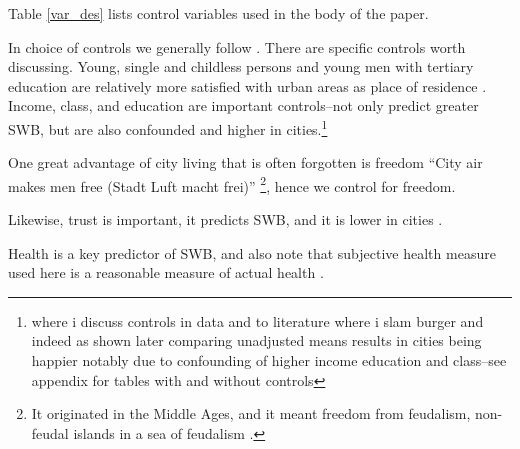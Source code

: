 \documentclass[10pt, letterpaper]{article}
\begin{document}


Table \ref{var_des} lists control variables used in the body of the
paper.%


 

In choice of controls we generally follow \citep{aok20}. There are specific
controls worth discussing.
%
 Young, single and childless persons and young men with tertiary education are
 relatively more satisfied with urban areas as place of residence \citep{anon-regional-studies-19}.
Income, class,  and education are important controls--not only predict greater
 SWB, but are also confounded and higher in cities.\footnote{where i discuss controls in data and to literature where i slam
  burger and indeed as shown later comparing unadjusted means results in cities
   being happier notably due to confounding of higher income education and
   class--see appendix for tables with and without controls} 

 One great advantage of city living that is often forgotten is freedom ``City
 air makes men free (Stadt Luft macht frei)'' \citet[p. 12]{park84}\footnote{It
   originated in the Middle Ages, and it meant freedom from feudalism,
   non-feudal islands in a sea of feudalism \citep{harvey12}.}, hence we control
 for freedom. 
 
 Likewise, trust is important, it predicts SWB, and it is lower in cities
 \citep{milgram70}.

Health is a key predictor of SWB, and also note that subjective health measure used here is a reasonable measure of actual health \citep{subramanian09b}.
\end{document}
